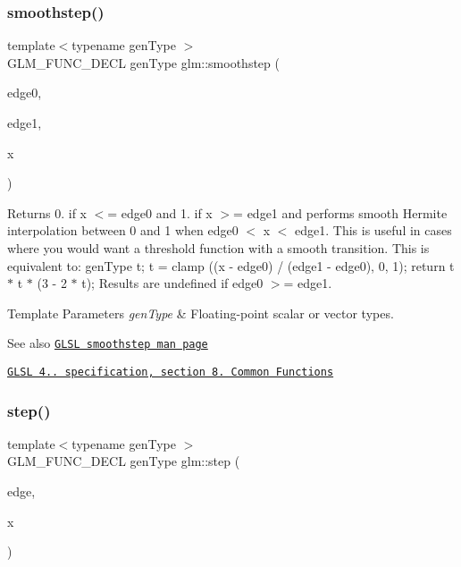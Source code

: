 \subsubsection{\texorpdfstring{smoothstep()}{smoothstep()}}
{\footnotesize\ttfamily template$<$typename gen\+Type $>$ \\
G\+L\+M\+\_\+\+F\+U\+N\+C\+\_\+\+D\+E\+CL gen\+Type glm\+::smoothstep (\begin{DoxyParamCaption}\item[{gen\+Type}]{edge0,  }\item[{gen\+Type}]{edge1,  }\item[{gen\+Type}]{x }\end{DoxyParamCaption})}

Returns 0. if x $<$= edge0 and 1. if x $>$= edge1 and performs smooth Hermite interpolation between 0 and 1 when edge0 $<$ x $<$ edge1. This is useful in cases where you would want a threshold function with a smooth transition. This is equivalent to\+: gen\+Type t; t = clamp ((x -\/ edge0) / (edge1 -\/ edge0), 0, 1); return t $\ast$ t $\ast$ (3 -\/ 2 $\ast$ t); Results are undefined if edge0 $>$= edge1.


\begin{DoxyTemplParams}{Template Parameters}
{\em gen\+Type} & Floating-\/point scalar or vector types.\\
\hline
\end{DoxyTemplParams}
\begin{DoxySeeAlso}{See also}
\href{http://www.opengl.org/sdk/docs/manglsl/xhtml/smoothstep.xml}{\tt G\+L\+SL smoothstep man page} 

\href{http://www.opengl.org/registry/doc/GLSLangSpec.4.20.8.pdf}{\tt G\+L\+SL 4.. specification, section 8. Common Functions} 
\end{DoxySeeAlso}
\mbox{\label{group__core__func__common_ga015a1261ff23e12650211aa872863cce}} 
\subsubsection{\texorpdfstring{step()}{step()}\hspace{0.1cm}{\footnotesize\ttfamily [1/3]}}
{\footnotesize\ttfamily template$<$typename gen\+Type $>$ \\
G\+L\+M\+\_\+\+F\+U\+N\+C\+\_\+\+D\+E\+CL gen\+Type glm\+::step (\begin{DoxyParamCaption}\item[{gen\+Type}]{edge,  }\item[{gen\+Type}]{x }\end{DoxyParamCaption})}

